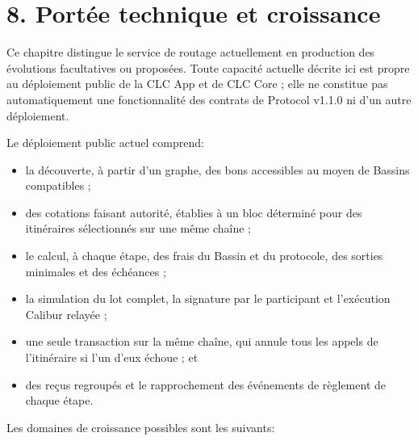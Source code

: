 \documentclass[11pt]{article}
\begin{document}
\section*{8. Portée technique et croissance}

Ce chapitre distingue le service de routage actuellement en production des évolutions facultatives ou proposées. Toute capacité actuelle décrite ici est propre au déploiement public de la CLC App et de CLC Core ; elle ne constitue pas automatiquement une fonctionnalité des contrats de Protocol v1.1.0 ni d'un autre déploiement.

Le déploiement public actuel comprend:

\begin{itemize}[leftmargin=*]
\item la découverte, à partir d'un graphe, des bons accessibles au moyen de Bassins compatibles ;
\item des cotations faisant autorité, établies à un bloc déterminé pour des itinéraires sélectionnés sur une même chaîne ;
\item le calcul, à chaque étape, des frais du Bassin et du protocole, des sorties minimales et des échéances ;
\item la simulation du lot complet, la signature par le participant et l'exécution Calibur relayée ;
\item une seule transaction sur la même chaîne, qui annule tous les appels de l'itinéraire si l'un d'eux échoue ; et
\item des reçus regroupés et le rapprochement des événements de règlement de chaque étape.
\end{itemize}
Les domaines de croissance possibles sont les suivants:
\end{document}
